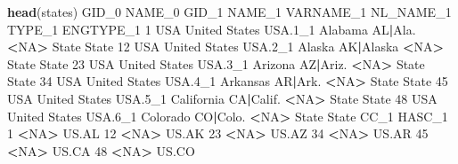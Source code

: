 \documentclass[]{book}
\newenvironment{Shaded}{\begin{snugshade}}{\end{snugshade}}
\newcommand{\DecValTok}[1]{\textcolor[rgb]{0.00,0.00,0.81}{#1}}
\newcommand{\FloatTok}[1]{\textcolor[rgb]{0.00,0.00,0.81}{#1}}
\newcommand{\KeywordTok}[1]{\textcolor[rgb]{0.13,0.29,0.53}{\textbf{#1}}}
\newcommand{\NormalTok}[1]{#1}
\newcommand{\OperatorTok}[1]{\textcolor[rgb]{0.81,0.36,0.00}{\textbf{#1}}}
\newcommand{\OtherTok}[1]{\textcolor[rgb]{0.56,0.35,0.01}{#1}}
\newcommand{\StringTok}[1]{\textcolor[rgb]{0.31,0.60,0.02}{#1}}
\begin{document}
\begin{Shaded}
\begin{Highlighting}[]
\KeywordTok{head}\NormalTok{(states)}
\NormalTok{   GID_}\DecValTok{0}\NormalTok{        NAME_}\DecValTok{0}\NormalTok{   GID_}\DecValTok{1}\NormalTok{     NAME_}\DecValTok{1}\NormalTok{ VARNAME_}\DecValTok{1}\NormalTok{ NL_NAME_}\DecValTok{1}\NormalTok{ TYPE_}\DecValTok{1}\NormalTok{ ENGTYPE_}\DecValTok{1}
\DecValTok{1}\NormalTok{    USA United States USA}\FloatTok{.1}\NormalTok{_}\DecValTok{1}\NormalTok{    Alabama   AL}\OperatorTok{|}\NormalTok{Ala.      }\OperatorTok{<}\OtherTok{NA}\OperatorTok{>}\StringTok{  }\NormalTok{State     State}
\DecValTok{12}\NormalTok{   USA United States USA}\FloatTok{.2}\NormalTok{_}\DecValTok{1}\NormalTok{     Alaska AK}\OperatorTok{|}\NormalTok{Alaska      }\OperatorTok{<}\OtherTok{NA}\OperatorTok{>}\StringTok{  }\NormalTok{State     State}
\DecValTok{23}\NormalTok{   USA United States USA}\FloatTok{.3}\NormalTok{_}\DecValTok{1}\NormalTok{    Arizona  AZ}\OperatorTok{|}\NormalTok{Ariz.      }\OperatorTok{<}\OtherTok{NA}\OperatorTok{>}\StringTok{  }\NormalTok{State     State}
\DecValTok{34}\NormalTok{   USA United States USA}\FloatTok{.4}\NormalTok{_}\DecValTok{1}\NormalTok{   Arkansas   AR}\OperatorTok{|}\NormalTok{Ark.      }\OperatorTok{<}\OtherTok{NA}\OperatorTok{>}\StringTok{  }\NormalTok{State     State}
\DecValTok{45}\NormalTok{   USA United States USA}\FloatTok{.5}\NormalTok{_}\DecValTok{1}\NormalTok{ California CA}\OperatorTok{|}\NormalTok{Calif.      }\OperatorTok{<}\OtherTok{NA}\OperatorTok{>}\StringTok{  }\NormalTok{State     State}
\DecValTok{48}\NormalTok{   USA United States USA}\FloatTok{.6}\NormalTok{_}\DecValTok{1}\NormalTok{   Colorado  CO}\OperatorTok{|}\NormalTok{Colo.      }\OperatorTok{<}\OtherTok{NA}\OperatorTok{>}\StringTok{  }\NormalTok{State     State}
\NormalTok{   CC_}\DecValTok{1}\NormalTok{ HASC_}\DecValTok{1}
\DecValTok{1}  \OperatorTok{<}\OtherTok{NA}\OperatorTok{>}\StringTok{  }\NormalTok{US.AL}
\DecValTok{12} \OperatorTok{<}\OtherTok{NA}\OperatorTok{>}\StringTok{  }\NormalTok{US.AK}
\DecValTok{23} \OperatorTok{<}\OtherTok{NA}\OperatorTok{>}\StringTok{  }\NormalTok{US.AZ}
\DecValTok{34} \OperatorTok{<}\OtherTok{NA}\OperatorTok{>}\StringTok{  }\NormalTok{US.AR}
\DecValTok{45} \OperatorTok{<}\OtherTok{NA}\OperatorTok{>}\StringTok{  }\NormalTok{US.CA}
\DecValTok{48} \OperatorTok{<}\OtherTok{NA}\OperatorTok{>}\StringTok{  }\NormalTok{US.CO}
\end{Highlighting}
\end{Shaded}
\end{document}
